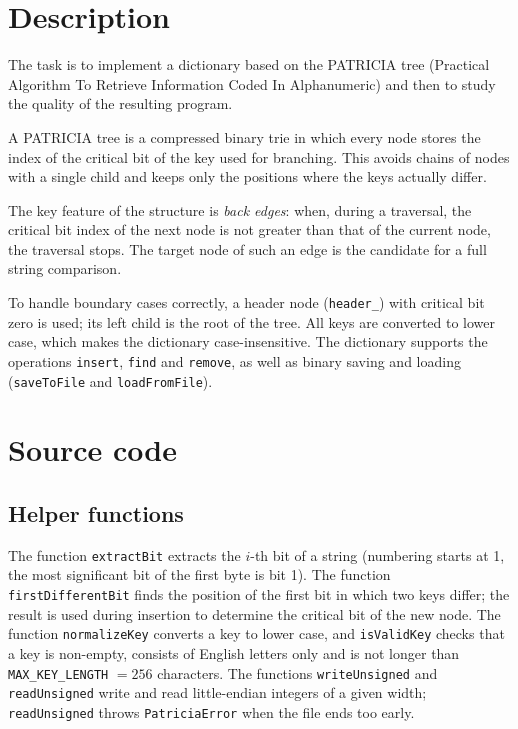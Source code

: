 \section{Description}

The task is to implement a dictionary based on the PATRICIA tree (Practical Algorithm To Retrieve
Information Coded In Alphanumeric) and then to study the quality of the resulting program.

A PATRICIA tree is a compressed binary trie in which every node stores the index of the critical
bit of the key used for branching. This avoids chains of nodes with a single child and keeps only
the positions where the keys actually differ.

The key feature of the structure is \textit{back edges}: when, during a traversal, the critical
bit index of the next node is not greater than that of the current node, the traversal stops. The
target node of such an edge is the candidate for a full string comparison.

To handle boundary cases correctly, a header node (\texttt{header\_}) with critical bit zero is
used; its left child is the root of the tree. All keys are converted to lower case, which makes
the dictionary case-insensitive. The dictionary supports the operations \texttt{insert},
\texttt{find} and \texttt{remove}, as well as binary saving and loading
(\texttt{saveToFile} and \texttt{loadFromFile}).

\pagebreak

\section{Source code}

\subsection{Helper functions}

The function \texttt{extractBit} extracts the $i$-th bit of a string (numbering starts at 1, the
most significant bit of the first byte is bit 1). The function \texttt{firstDifferentBit} finds the
position of the first bit in which two keys differ; the result is used during insertion to
determine the critical bit of the new node. The function \texttt{normalizeKey} converts a key to
lower case, and \texttt{isValidKey} checks that a key is non-empty, consists of English letters
only and is not longer than \texttt{MAX\_KEY\_LENGTH} $= 256$ characters. The functions
\texttt{writeUnsigned} and \texttt{readUnsigned} write and read little-endian integers of a given
width; \texttt{readUnsigned} throws \texttt{PatriciaError} when the file ends too early.

